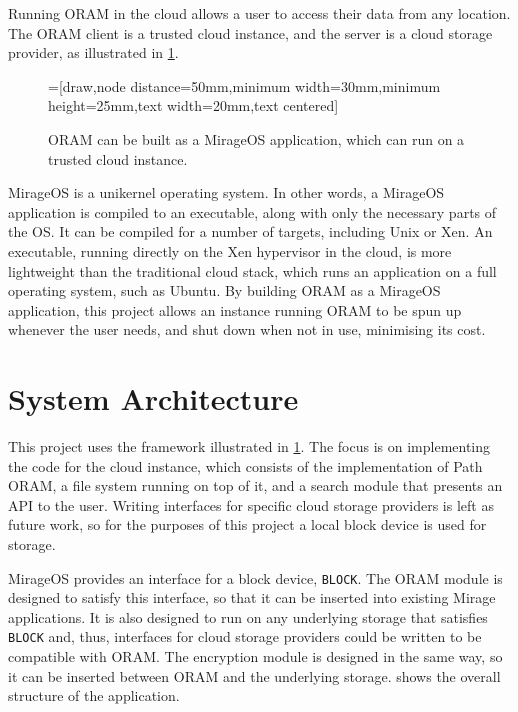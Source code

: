 \documentclass[12pt,a4paper,twoside,openright]{report}
\begin{document}
Running ORAM in the cloud allows a user to access their data from any location. The ORAM client is a trusted cloud instance, and the server is a cloud storage provider, as illustrated in \cref{fig:cloudInstance}.

\begin{figure}
    \centering
    =[draw,node distance=50mm,minimum width=30mm,minimum height=25mm,text width=20mm,text centered]
    \caption{ORAM can be built as a MirageOS application, which can run on a trusted cloud instance.}
    \label{fig:cloudInstance}
\end{figure}

MirageOS is a unikernel operating system. In other words, a MirageOS application is compiled to an executable, along with only the necessary parts of the OS. It can be compiled for a number of targets, including Unix or Xen. An executable, running directly on the Xen hypervisor in the cloud, is more lightweight than the traditional cloud stack, which runs an application on a full operating system, such as Ubuntu. By building ORAM as a MirageOS application, this project allows an instance running ORAM to be spun up whenever the user needs, and shut down when not in use, minimising its cost.

\section{System Architecture}

This project uses the framework illustrated in \cref{fig:cloudInstance}. The focus is on implementing the code for the cloud instance, which consists of the implementation of Path ORAM, a file system running on top of it, and a search module that presents an API to the user. Writing interfaces for specific cloud storage providers is left as future work, so for the purposes of this project a local block device is used for storage.

MirageOS provides an interface for a block device, \texttt{BLOCK}. The ORAM module is designed to satisfy this interface, so that it can be inserted into existing Mirage applications. It is also designed to run on any underlying storage that satisfies \texttt{BLOCK} and, thus, interfaces for cloud storage providers could be written to be compatible with ORAM. The encryption module is designed in the same way, so it can be inserted between ORAM and the underlying storage.  shows the overall structure of the application.
\end{document}
